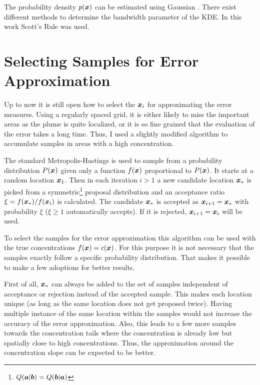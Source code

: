 The probability density $p(\bm{x})$ can be estimated using Gaussian 
. There exist different methods to 
determine the bandwidth parameter of the KDE\@. In this work Scott's Rule 
\parencite{Scott:2009tl} was used.

\section{Selecting Samples for Error Approximation}\label{sec:mh}
Up to now it is still open how to select the $\bm{x}_i$ for approximating the 
error measures.  Using a regularly spaced grid, it is either likely to miss the 
important areas as the plume is quite localized, or it is so fine grained that 
the evaluation of the error takes a long time. Thus, I used a slightly modified 
 algorithm to accumulate samples in areas with 
a high concentration.

The standard Metropolis-Hastings \parencite{Chib:1994ud} is used to sample from 
a probability distribution $P(\bm{x})$ given only a function $f(\bm{x})$ 
proportional to $P(\bm{x})$. It starts at a random location $\bm{x}_1$.  Then in 
each iteration $i > 1$ a new candidate location $\bm{x}_*$ is picked from 
a symmetric\footnote{$Q(\bm{a} | \bm{b}) = Q(\bm{b} | \bm{a})$} proposal 
distribution and an acceptance ratio $\xi = f(\bm{x}_*) / f(\bm{x}_i)$ is 
calculated. The candidate $\bm{x}_*$ is accepted as $\bm{x}_{i + 1} = \bm{x}_*$ 
with probability $\xi$ ($\xi \geq 1$ automatically accepts). If it is rejected, 
$\bm{x}_{i + 1} = \bm{x}_i$ will be used.

To select the samples for the error approximation this algorithm can be used 
with the true concentrations $f(\bm{x}) = c(\bm{x})$. For this purpose it is not 
necessary that the samples exactly follow a specific probability distribution.  
That makes it possible to make a few adoptions for better results.

First of all, $\bm{x}_*$ can always be added to the set of samples independent of 
acceptance or rejection instead of the accepted sample.  This makes each 
location unique (as long as the same location does not get proposed twice).  
Having multiple instance of the same location within the samples would not 
increase the accuracy of the error approximation. Also, this leads to a few more 
samples towards the concentration tails where the concentration is already low 
but spatially close to high concentrations.  Thus, the approximation around the 
concentration slope can be expected to be better.

